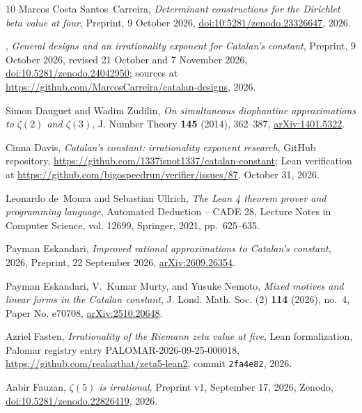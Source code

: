 \documentclass[11pt]{amsart}
\theoremstyle{definition}
\theoremstyle{remark}
\numberwithin{equation}{section}
\begin{document}
\begin{thebibliography}{10}
Marcos Costa Santos~Carreira, \emph{Determinant constructions for the
  {D}irichlet beta value at four}, Preprint, 9 October 2026,
  \href{https://doi.org/10.5281/zenodo.23326647}{doi:10.5281/zenodo.23326647},
  2026.

\bysame, \emph{General designs and an irrationality exponent for {C}atalan's
  constant}, Preprint, 9 October 2026, revised 21 October and 7 November 2026,
  \href{https://doi.org/10.5281/zenodo.24042950}{doi:10.5281/zenodo.24042950};
  sources at \url{https://github.com/MarcosCarreira/catalan-designs}, 2026.

Simon Dauguet and Wadim Zudilin, \emph{On simultaneous diophantine
  approximations to {$\zeta(2)$} and {$\zeta(3)$}}, J. Number Theory
  \textbf{145} (2014), 362--387,
  \href{https://arxiv.org/abs/1401.5322}{arXiv:1401.5322}.

Cinna Davis, \emph{Catalan's constant: irrationality exponent research}, GitHub
  repository, \url{https://github.com/1337isnot1337/catalan-constant}; Lean
  verification at \url{https://github.com/bigospeedrun/verifier/issues/87},
  October 31, 2026.

Leonardo de~Moura and Sebastian Ullrich, \emph{The {L}ean 4 theorem prover and
  programming language}, Automated Deduction -- CADE 28, Lecture Notes in
  Computer Science, vol. 12699, Springer, 2021, pp.~625--635.

Payman Eskandari, \emph{Improved rational approximations to {C}atalan's
  constant}, 2026, Preprint, 22 September 2026,
  \href{https://arxiv.org/abs/2609.26354}{arXiv:2609.26354}.

Payman Eskandari, V.~Kumar Murty, and Yusuke Nemoto, \emph{Mixed motives and
  linear forms in the {C}atalan constant}, J. Lond. Math. Soc. (2) \textbf{114}
  (2026), no.~4, Paper No. e70708,
  \href{https://arxiv.org/abs/2510.20648}{arXiv:2510.20648}.

Azriel Fasten, \emph{Irrationality of the {R}iemann zeta value at five}, Lean
  formalization, Palomar registry entry PALOMAR-2026-09-25-000018,
  \url{https://github.com/realazthat/zeta5-lean2}, commit \texttt{2fa4e82},
  2026.

Aabir Fauzan, \emph{{$\zeta(5)$} is irrational}, Preprint v1, September 17,
  2026, Zenodo,
  \href{https://doi.org/10.5281/zenodo.22826419}{doi:10.5281/zenodo.22826419},
  2026.


\end{thebibliography}
\end{document}
